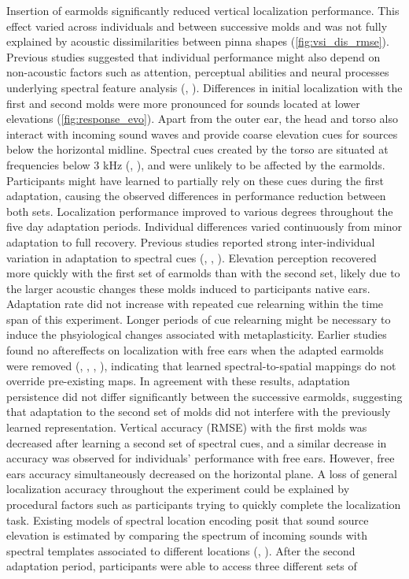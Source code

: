 Insertion of earmolds significantly reduced vertical localization performance. This effect varied across individuals and between successive molds and was not fully explained by acoustic dissimilarities between pinna shapes (\cref{fig:vsi_dis_rmse}). Previous studies suggested that individual performance might also depend on non-acoustic factors such as attention, perceptual abilities and neural processes underlying spectral feature analysis (\citet{majdak_acoustic_2014}, \citet{andeol_sound_2013}). Differences in initial localization with the first and second molds were more pronounced for sounds located at lower elevations (\cref{fig:response_evo}). Apart from the outer ear, the head and torso also interact with incoming sound waves and provide coarse elevation cues for sources below the horizontal midline. Spectral cues created by the torso are situated at frequencies below 3 kHz (\citet{asano_role_1990}, \citet{algazi_elevation_2001}), and were unlikely to be affected by the earmolds. Participants might have learned to partially rely on these cues during the first adaptation, causing the observed differences in performance reduction between both sets. Localization performance improved to various degrees throughout the five day adaptation periods. Individual differences varied continuously from minor adaptation to full recovery. Previous studies reported strong inter-individual variation in adaptation to spectral cues (\citet{hofman_relearning_1998}, \citet{wanrooij_relearning_2005}, \citet{trapeau_fast_2016}). Elevation perception recovered more quickly with the first set of earmolds than with the second set, likely due to the larger acoustic changes these molds induced to participants native ears. Adaptation rate did not increase with repeated cue relearning within the time span of this experiment. Longer periods of cue relearning might be necessary to induce the phsyiological changes associated with metaplasticity. Earlier studies found no aftereffects on localization with free ears when the adapted earmolds were removed (\citet{carlile_relearning_2014}, \citet{hofman_relearning_1998}, \citet{trapeau_fast_2016}, \citet{wanrooij_relearning_2005}), indicating that learned spectral-to-spatial mappings do not override pre-existing maps. In agreement with these results, adaptation persistence did not differ significantly between the successive earmolds, suggesting that adaptation to the second set of molds did not interfere with the previously learned representation. Vertical accuracy (RMSE) with the first molds was decreased after learning a second set of spectral cues, and a similar decrease in accuracy was observed for individuals' performance with free ears. However, free ears accuracy simultaneously decreased on the horizontal plane. A loss of general localization accuracy throughout the experiment could be explained by procedural factors such as participants trying to quickly complete the localization task. Existing models of spectral location encoding posit that sound source elevation is estimated by comparing the spectrum of incoming sounds with spectral templates associated to different locations (\citet{hofman_spectro-temporal_1998}, \citet{langendijk_contribution_2002}). After the second adaptation period, participants were able to access three different sets of 